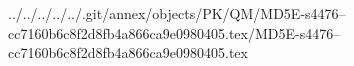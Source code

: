 ../../../../../.git/annex/objects/PK/QM/MD5E-s4476--cc7160b6c8f2d8fb4a866ca9e0980405.tex/MD5E-s4476--cc7160b6c8f2d8fb4a866ca9e0980405.tex